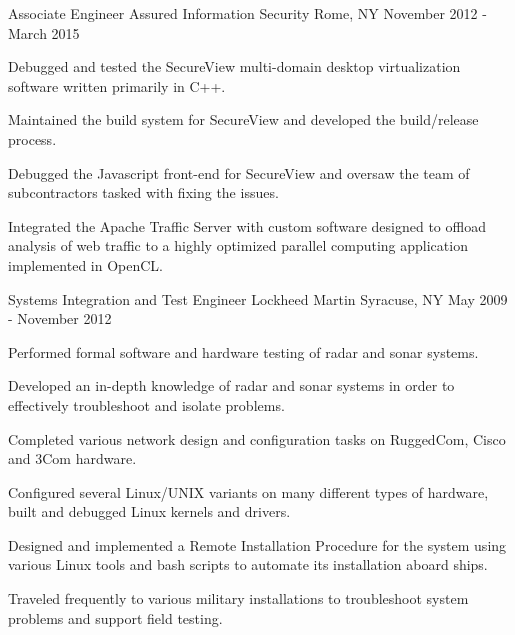 \begin{cventries}
  \cventry
    {Associate Engineer} %
    {Assured Information Security} %
    {Rome, NY} %
    {November 2012 - March 2015} %
    {
      \begin{cvitems} %
        \item {Debugged and tested the SecureView multi-domain desktop virtualization software written primarily in C++.}
        \item {Maintained the build system for SecureView and developed the build/release process.}
        \item {Debugged the Javascript front-end for SecureView and oversaw the team of subcontractors tasked with fixing the issues.}
        \item {Integrated the Apache Traffic Server with custom software designed to offload analysis of web traffic to a highly optimized parallel computing application implemented in OpenCL.}
      \end{cvitems}
    }

  \cventry
    {Systems Integration and Test Engineer} %
    {Lockheed Martin} %
    {Syracuse, NY} %
    {May 2009 - November 2012} %
    {
      \begin{cvitems} %
        \item {Performed formal software and hardware testing of radar and sonar systems.}
        \item {Developed an in-depth knowledge of radar and sonar systems in order to effectively troubleshoot and isolate problems.}
        \item {Completed various network design and configuration tasks on RuggedCom, Cisco and 3Com hardware.}
        \item {Configured several Linux/UNIX variants on many different types of hardware, built and debugged Linux kernels and drivers.}
        \item {Designed and implemented a Remote Installation Procedure for the system using various Linux tools and bash scripts to automate its installation aboard ships.}
        \item {Traveled frequently to various military installations to troubleshoot system problems and support field testing.}
      \end{cvitems}
    }

\end{cventries}
